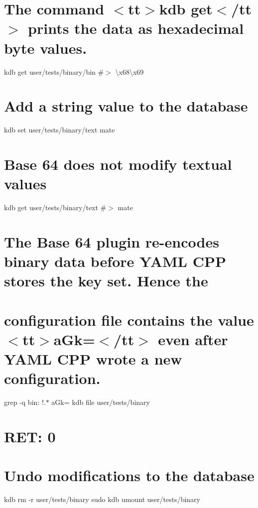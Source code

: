 \hypertarget{autotoc_md780_autotoc_md835}{}\section{The command $<$tt$>$kdb get$<$/tt$>$ prints the data as hexadecimal byte values.}\label{autotoc_md780_autotoc_md835}
kdb get user/tests/binary/bin \#$>$ \textbackslash{}x68\textbackslash{}x69\hypertarget{autotoc_md780_autotoc_md836}{}\section{Add a string value to the database}\label{autotoc_md780_autotoc_md836}
kdb set user/tests/binary/text mate \hypertarget{autotoc_md780_autotoc_md837}{}\section{Base 64 does not modify textual values}\label{autotoc_md780_autotoc_md837}
kdb get user/tests/binary/text \#$>$ mate\hypertarget{autotoc_md780_autotoc_md838}{}\section{The Base 64 plugin re-\/encodes binary data before Y\+A\+M\+L C\+P\+P stores the key set. Hence the}\label{autotoc_md780_autotoc_md838}
\hypertarget{autotoc_md780_autotoc_md839}{}\section{configuration file contains the value $<$tt$>$a\+Gk=$<$/tt$>$ even after Y\+A\+M\+L C\+P\+P wrote a new configuration.}\label{autotoc_md780_autotoc_md839}
grep -\/q \textquotesingle{}bin\+: !.$\ast$ a\+Gk=\textquotesingle{} {\ttfamily kdb file user/tests/binary} \hypertarget{autotoc_md780_autotoc_md840}{}\section{R\+E\+T\+: 0}\label{autotoc_md780_autotoc_md840}
\hypertarget{autotoc_md780_autotoc_md841}{}\section{Undo modifications to the database}\label{autotoc_md780_autotoc_md841}
kdb rm -\/r user/tests/binary sudo kdb umount user/tests/binary 
\begin{DoxyCode}{0}
\DoxyCodeLine{}
\end{DoxyCode}
